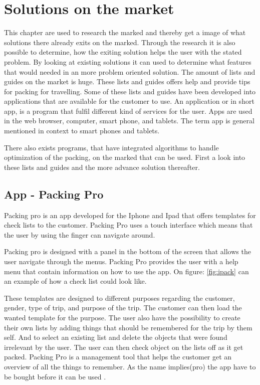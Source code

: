 \section{Solutions on the market}
\label{sec:Solution}
This chapter are used to research the marked and thereby get a image of what solutions there already exits on the marked. Through the research it is also possible to determine, how the exiting solution helps the user with the stated problem. By looking at existing solutions it can used to determine what features that would needed in an more problem oriented solution.
The amount of lists and guides on the market is huge. These lists and guides offers help and provide tips for packing for travelling. Some of these lists and guides have been developed into applications that are available for the customer to use.
An application or in short app, is a program that fulfil different kind of services for the user. Apps are used in the web browser, computer, smart phone, and tablets. The term app is general mentioned in context to smart phones and tablets.

There also exists programs, that have integrated algorithms to handle optimization of the packing, on the marked that can be used.
First a look into these lists and guides and the more advance solution thereafter.

\subsection{App - Packing Pro}

Packing pro is an app developed for the Iphone and Ipad that offers templates for check lists to the customer. Packing Pro uses a touch interface which means that the user by using the finger can navigate around.


Packing pro is designed with a panel in the bottom of the screen that allows the user navigate through the menus. Packing Pro provides the user with a help menu that contain information on how to use the app. On figure: \ref{fig:ipack} can an example of how a check list could look like.

These templates are designed to different purposes regarding the customer, gender, type of trip, and purpose of the trip.
The customer can then load the wanted template for the purpose. The user also have the possibility to create their own lists by adding things that should be remembered for the trip by them self. And to select an existing list and delete the objects that were found irrelevant by the user. The user can then check object on the lists off as it get packed. Packing Pro is a management tool that helps the customer get an overview of all the things to remember. As the name implies(pro) the app have to be bought before it can be used  \citep{packingpro}.

